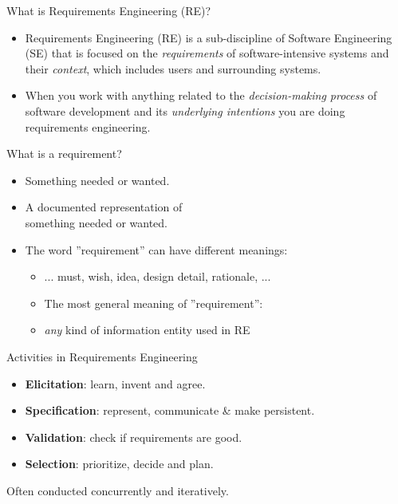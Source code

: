 \documentclass{beamer}
\begin{document}
\begin{frame}[fragile]{What is Requirements Engineering (RE)?}
\begin{itemize}
\item  Requirements Engineering (RE) is a sub-discipline of Software Engineering (SE) that is focused on the \textit{requirements} of software-intensive systems and their \textit{context}, which includes users and surrounding systems.
\item When you work with anything related to the \textit{decision-making process} of software development and its \emph{underlying intentions} you are doing requirements engineering.
\end{itemize}
\end{frame}

\begin{frame}[fragile]{What is a requirement?}
\begin{itemize}
\item Something needed or wanted.
\item A documented representation of \\something needed or wanted.
\item The word ''requirement'' can have different meanings:
\begin{itemize}
\item ... must, wish, idea, design detail, rationale, ...
\item The most general meaning of ''requirement'':
\item[] \emph{any} kind of information entity used in RE
\end{itemize}
\end{itemize}
\end{frame}

\begin{frame}[fragile]{Activities in Requirements Engineering}
\begin{itemize}
\item \textbf{Elicitation}: learn, invent and agree.
\item \textbf{Specification}: represent, communicate \& make persistent.
\item \textbf{Validation}: check if requirements are good.
\item \textbf{Selection}: prioritize, decide and plan.
\end{itemize}
\vspace*{1em}
Often conducted concurrently and iteratively.
\end{frame}
\end{document}
